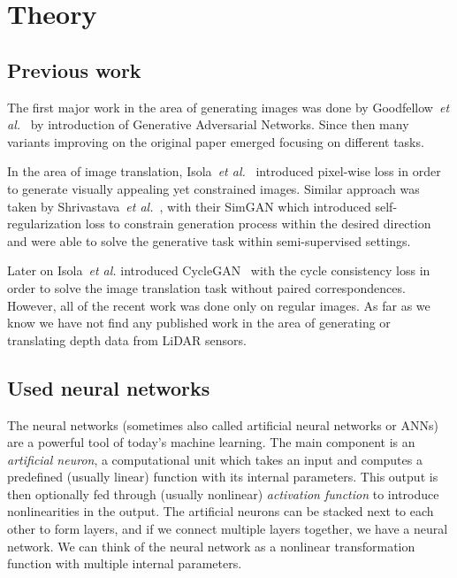 \chapter{Theory}

\section{Previous work}

The first major work in the area of generating images was done by Goodfellow~{\em et al.}~\cite{origgan} by introduction of Generative Adversarial Networks. Since then many variants improving on the original paper emerged focusing on different tasks.

In the area of image translation, Isola~{\em et al.}~\cite{pix2pix} introduced pixel-wise loss in order to generate visually appealing yet constrained images. Similar approach was taken by Shrivastava~{\em et al.}~\cite{historypool}, with their SimGAN which introduced self-regularization loss to constrain generation process within the desired direction and were able to solve the generative task within semi-supervised settings.

Later on Isola~{\em et al.} introduced CycleGAN~\cite{cyclegan} with the cycle consistency loss in order to solve the image translation task without paired correspondences. However, all of the recent work was done only on regular images. As far as we know we have not find any published work in the area of generating or translating depth data from LiDAR sensors.

\section{Used neural networks} \label{nets}

The neural networks (sometimes also called artificial neural networks or ANNs) are a powerful tool of today's machine learning. The main component is an {\em artificial neuron}, a computational unit which takes an input and computes a predefined (usually linear) function with its internal parameters. This output is then optionally fed through (usually nonlinear) {\em activation function} to introduce nonlinearities in the output. The artificial neurons can be stacked next to each other to form layers, and if we connect multiple layers together, we have a neural network. We can think of the neural network as a nonlinear transformation function with multiple internal parameters.


